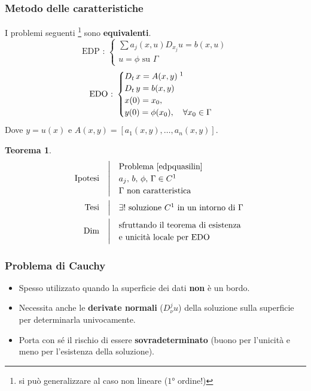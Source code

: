 \documentclass[serif,notheorems]{beamer}
\makeatletter
\newenvironment{ipotesi}%
{\quad\left|\quad\def\arraystretch{1.2}\begin{array}{@{}l@{}}}%
{\end{array}\right.}
\newcommand{\hpthdim}[3]
{
\begin{align*}
\quad
\text{Ipotesi}
&\begin{ipotesi} 
#1
\end{ipotesi}\\
\text{Tesi}
&\begin{ipotesi}
#2
\end{ipotesi}\\
\text{Dim}
&\begin{ipotesi}
#3
\end{ipotesi}
\end{align*}
}
\theoremstyle{definition} %
\newtheorem{theorem}{Teorema}[section] %
\theoremstyle{remark}
\makeatother
\begin{document}
\begin{frame}
\frametitle{Metodo delle caratteristiche}
I problemi seguenti \footnote{si può generalizzare al caso non lineare ($1$° ordine!)} sono \textbf{equivalenti}.
\begin{equation} \label{edpquasilin}
\text{EDP : }
\begin{cases}
\sum a_j(x,u)D_{x_j} u = b(x,u)\\
u = \phi \text{ su } \Gamma
\end{cases} 
\end{equation}
\begin{equation}
\text{EDO : }
\begin{cases}
D_t \, x = A(x,y) \; \footnotemark \\
D_t \, y = b(x,y)\\ 
x(0)=x_0,\\ 
y(0) = \phi (x_0), \quad \forall x_0 \in \Gamma
\end{cases} 
\end{equation}
Dove $y = u(x)$ e $A(x,y)=[a_1(x,y),\ldots ,a_n(x,y)]$.
\end{frame}

\begin{frame}
\begin{theorem}
\hpthdim{
\text{Problema \eqref{edpquasilin} } \\
a_j, \, b, \, \phi , \, \Gamma \in C^1\\
\Gamma \text{ non caratteristica}
}{
\exists ! \text{ soluzione } C^1 \text{ in un intorno di } \Gamma
}
{
\text{sfruttando il teorema di esistenza}\\ \text{e unicità locale per EDO}
}
\end{theorem}
\end{frame}

\begin{frame}
\frametitle{Problema di Cauchy}
\begin{itemize}
\item Spesso utilizzato quando la superficie dei dati \textbf{non} è un bordo.
\item Necessita anche le \textbf{derivate normali} ($D^j_\nu u$) della soluzione sulla superficie per determinarla univocamente.
\item Porta con sé il rischio di essere \textbf{sovradeterminato} (buono per l'unicità e meno per l'esistenza della soluzione).
\end{itemize}
\end{frame}
\end{document}
